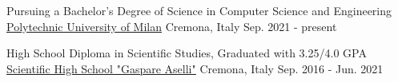 

\begin{cventries}

  \cventry
    {Pursuing a Bachelor's Degree of Science in Computer Science and Engineering} %
    {\underline{\href{https://www.polimi.it/en/}{Polytechnic University of Milan}}} %
    {Cremona, Italy} %
    {Sep. 2021 - present} %
    {
    }

  \cventry
    {High School Diploma in Scientific Studies, Graduated with 3.25/4.0 GPA} %
    {\underline{\href{https://liceoaselli.edu.it/}{Scientific High School "Gaspare Aselli"}}} %
    {Cremona, Italy} %
    {Sep. 2016 - Jun. 2021} %
    {
    }

\end{cventries}
